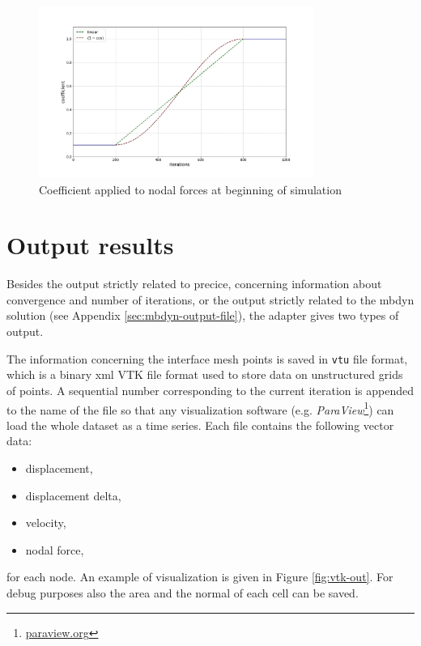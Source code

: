 \begin{figure}[htbp!]
	\centering
	\includegraphics[width=0.8\textwidth]{images/coeff.png}
	\caption{Coefficient applied to nodal forces at beginning of simulation}
	\label{fig:sim-coeff}
\end{figure}


\section{Output results}
\label{sec:mbdyn-adapter-output}

Besides the output strictly related to \acrshort{precice}, concerning information about convergence and number of iterations, or the output strictly related to the \acrshort{mbdyn} solution (see Appendix \ref{sec:mbdyn-output-file}), the adapter gives two types of output.

The information concerning the interface mesh points is saved in \texttt{vtu} file format, which is a binary \acrshort{xml} VTK  file format used to store data on unstructured grids of points. A sequential number corresponding to the current iteration is appended to the name of the file so that any visualization software (e.g. \textit{ParaView}\footnote{\href{https://www.paraview.org/}{paraview.org}}) can load the whole dataset as a time series. Each file contains the following vector data:

\begin{itemize}
    \item displacement,
    \item displacement delta,
    \item velocity,
    \item nodal force,
\end{itemize}

for each node. An example of visualization is given in Figure \ref{fig:vtk-out}. For debug purposes also the area and the normal of each cell can be saved. 

